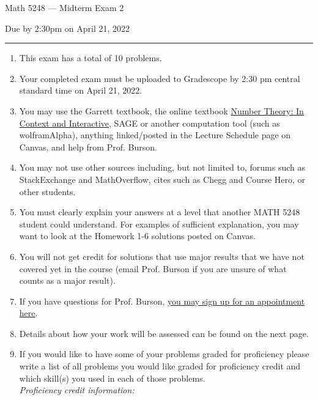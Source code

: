 \documentclass[11pt,addpoints,letterpaper]{exam}
\begin{document}
\vspace*{-0.5in}

\ifprintanswers
\begin{center}
\end{center}
\fi

{\centering

\LARGE Math 5248 --- Midterm Exam 2

}

\smallskip

{\centering

\large Due by 2:30pm on April 21, 2022

}

\bigskip\bigskip


\hrule

\begin{enumerate}[leftmargin=2em,rightmargin=1em]\setlength{\itemsep}{-2pt}


\item This exam has a total of 10 problems. 


\item Your completed exam must be uploaded to Gradescope by 2:30 pm central standard time on April 21, 2022.  

\item You may use the Garrett textbook, the online textbook \href{http://math.gordon.edu/ntic/ntic/frontmatter-1.html}{Number Theory: In Context and Interactive}, SAGE or another computation tool (such as wolframAlpha), anything linked/posted in the Lecture Schedule page on Canvas, and help from Prof. Burson.

\item You may not use other sources including, but not limited to, forums such as StackExchange and MathOverflow, cites such as Chegg and Course Hero, or other students. 

\item You must clearly explain your answers at a level that another MATH 5248 student could understand.  For examples of sufficient explanation, you may  want to look at the Homework 1-6 solutions posted on Canvas.  

\item You will not get credit for solutions that use major results that we have not covered yet in the course (email Prof. Burson if you are unsure of what counts as a major result). 

\item If you have questions for Prof. Burson, \href{https://calendly.com/hburson/meetings-with-dr-burson}{you may sign up for an appointment here}. 

\item Details about how your work will be assessed can be found on the next page. 

\item If you would like to have some of your problems graded for proficiency please write a list of all problems you would like graded for proficiency credit and which skill(s) you used in each of those problems. \\
\emph{Proficiency credit information:}



\end{enumerate}
\end{document}
